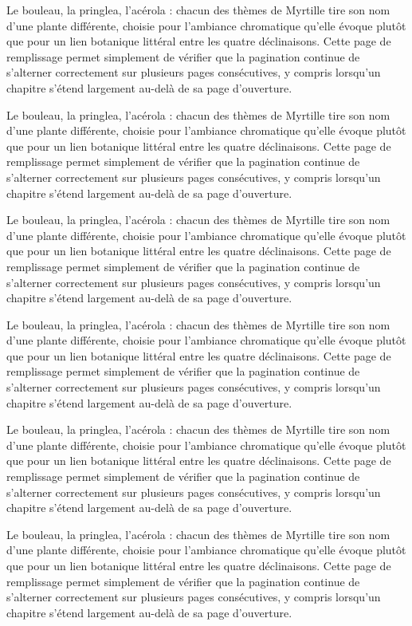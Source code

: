 \documentclass[theme=pringlea]{myrtillebook}
\begin{document}
Le bouleau, la pringlea, l'acérola : chacun des thèmes de Myrtille tire son nom d'une plante différente, choisie pour l'ambiance chromatique qu'elle évoque plutôt que pour un lien botanique littéral entre les quatre déclinaisons. Cette page de remplissage permet simplement de vérifier que la pagination continue de s'alterner correctement sur plusieurs pages consécutives, y compris lorsqu'un chapitre s'étend largement au-delà de sa page d'ouverture.

Le bouleau, la pringlea, l'acérola : chacun des thèmes de Myrtille tire son nom d'une plante différente, choisie pour l'ambiance chromatique qu'elle évoque plutôt que pour un lien botanique littéral entre les quatre déclinaisons. Cette page de remplissage permet simplement de vérifier que la pagination continue de s'alterner correctement sur plusieurs pages consécutives, y compris lorsqu'un chapitre s'étend largement au-delà de sa page d'ouverture.

Le bouleau, la pringlea, l'acérola : chacun des thèmes de Myrtille tire son nom d'une plante différente, choisie pour l'ambiance chromatique qu'elle évoque plutôt que pour un lien botanique littéral entre les quatre déclinaisons. Cette page de remplissage permet simplement de vérifier que la pagination continue de s'alterner correctement sur plusieurs pages consécutives, y compris lorsqu'un chapitre s'étend largement au-delà de sa page d'ouverture.

Le bouleau, la pringlea, l'acérola : chacun des thèmes de Myrtille tire son nom d'une plante différente, choisie pour l'ambiance chromatique qu'elle évoque plutôt que pour un lien botanique littéral entre les quatre déclinaisons. Cette page de remplissage permet simplement de vérifier que la pagination continue de s'alterner correctement sur plusieurs pages consécutives, y compris lorsqu'un chapitre s'étend largement au-delà de sa page d'ouverture.

Le bouleau, la pringlea, l'acérola : chacun des thèmes de Myrtille tire son nom d'une plante différente, choisie pour l'ambiance chromatique qu'elle évoque plutôt que pour un lien botanique littéral entre les quatre déclinaisons. Cette page de remplissage permet simplement de vérifier que la pagination continue de s'alterner correctement sur plusieurs pages consécutives, y compris lorsqu'un chapitre s'étend largement au-delà de sa page d'ouverture.

Le bouleau, la pringlea, l'acérola : chacun des thèmes de Myrtille tire son nom d'une plante différente, choisie pour l'ambiance chromatique qu'elle évoque plutôt que pour un lien botanique littéral entre les quatre déclinaisons. Cette page de remplissage permet simplement de vérifier que la pagination continue de s'alterner correctement sur plusieurs pages consécutives, y compris lorsqu'un chapitre s'étend largement au-delà de sa page d'ouverture.
\end{document}
